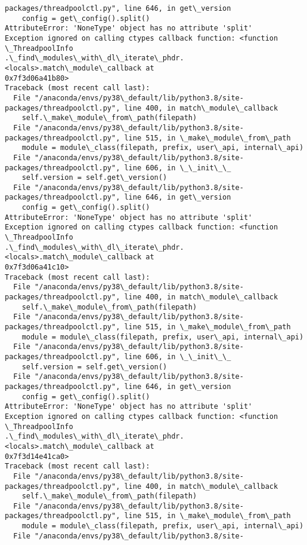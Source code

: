 \documentclass[11pt]{article}
\begin{document}
\begin{Verbatim}[commandchars=\\\{\}]
packages/threadpoolctl.py", line 646, in get\_version
    config = get\_config().split()
AttributeError: 'NoneType' object has no attribute 'split'
Exception ignored on calling ctypes callback function: <function \_ThreadpoolInfo
.\_find\_modules\_with\_dl\_iterate\_phdr.<locals>.match\_module\_callback at
0x7f3d06a41b80>
Traceback (most recent call last):
  File "/anaconda/envs/py38\_default/lib/python3.8/site-
packages/threadpoolctl.py", line 400, in match\_module\_callback
    self.\_make\_module\_from\_path(filepath)
  File "/anaconda/envs/py38\_default/lib/python3.8/site-
packages/threadpoolctl.py", line 515, in \_make\_module\_from\_path
    module = module\_class(filepath, prefix, user\_api, internal\_api)
  File "/anaconda/envs/py38\_default/lib/python3.8/site-
packages/threadpoolctl.py", line 606, in \_\_init\_\_
    self.version = self.get\_version()
  File "/anaconda/envs/py38\_default/lib/python3.8/site-
packages/threadpoolctl.py", line 646, in get\_version
    config = get\_config().split()
AttributeError: 'NoneType' object has no attribute 'split'
Exception ignored on calling ctypes callback function: <function \_ThreadpoolInfo
.\_find\_modules\_with\_dl\_iterate\_phdr.<locals>.match\_module\_callback at
0x7f3d06a41c10>
Traceback (most recent call last):
  File "/anaconda/envs/py38\_default/lib/python3.8/site-
packages/threadpoolctl.py", line 400, in match\_module\_callback
    self.\_make\_module\_from\_path(filepath)
  File "/anaconda/envs/py38\_default/lib/python3.8/site-
packages/threadpoolctl.py", line 515, in \_make\_module\_from\_path
    module = module\_class(filepath, prefix, user\_api, internal\_api)
  File "/anaconda/envs/py38\_default/lib/python3.8/site-
packages/threadpoolctl.py", line 606, in \_\_init\_\_
    self.version = self.get\_version()
  File "/anaconda/envs/py38\_default/lib/python3.8/site-
packages/threadpoolctl.py", line 646, in get\_version
    config = get\_config().split()
AttributeError: 'NoneType' object has no attribute 'split'
Exception ignored on calling ctypes callback function: <function \_ThreadpoolInfo
.\_find\_modules\_with\_dl\_iterate\_phdr.<locals>.match\_module\_callback at
0x7f3d14e41ca0>
Traceback (most recent call last):
  File "/anaconda/envs/py38\_default/lib/python3.8/site-
packages/threadpoolctl.py", line 400, in match\_module\_callback
    self.\_make\_module\_from\_path(filepath)
  File "/anaconda/envs/py38\_default/lib/python3.8/site-
packages/threadpoolctl.py", line 515, in \_make\_module\_from\_path
    module = module\_class(filepath, prefix, user\_api, internal\_api)
  File "/anaconda/envs/py38\_default/lib/python3.8/site-

\end{Verbatim}
\end{document}
